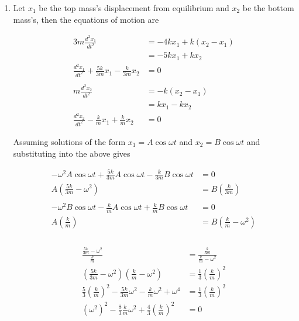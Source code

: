 \documentclass{article}
\begin{document}
\begin{enumerate}
  \item Let $x_1$ be the top mass's displacement from equilibrium and $x_2$ be the bottom mass's, then the equations of motion are

        \begin{align*}
          3 m \frac{d^2 x_1}{d t^2}                                       & = -4 k x_1 + k (x_2 - x_1) \\
                                                                          & = -5 k x_1 + k x_2         \\
          \frac{d^2 x_1}{d t^2} + \frac{5 k}{3 m} x_1 - \frac{k}{3 m} x_2 & = 0                        \\ \\
          m \frac{d^2 x_2}{d t^2}                                         & = -k (x_2 - x_1)           \\
                                                                          & = k x_1 - k x_2            \\
          \frac{d^2 x_2}{d t^2} - \frac{k}{m} x_1 + \frac{k}{m} x_2       & = 0
        \end{align*}

        Assuming solutions of the form $x_1 = A \cos \omega t$ and $x_2 = B \cos \omega t$ and substituting into the above gives

        \begin{align*}
          -\omega^2 A \cos \omega t + \frac{5 k}{3 m} A \cos \omega t - \frac{k}{3 m} B \cos \omega t & = 0                                       \\
          A \left( \frac{5 k}{3 m} - \omega^2 \right)                                                 & = B \left( \frac{k}{3 m} \right)          \\ \\
          -\omega^2 B \cos \omega t - \frac{k}{m} A \cos \omega t + \frac{k}{m} B \cos \omega t       & = 0                                       \\
          A \left( \frac{k}{m} \right)                                                                & = B \left( \frac{k}{m} - \omega^2 \right) \\ \\
        \end{align*}

        \begin{align*}
          \frac{\frac{5 k}{3 m} - \omega^2}{\frac{k}{m}}                                                        & = \frac{\frac{k}{3 m}}{\frac{k}{m} - \omega^2} \\
          \left( \frac{5 k}{3 m} - \omega^2 \right) \left( \frac{k}{m} - \omega^2 \right)                       & = \frac{1}{3} \left( \frac{k}{m} \right)^2     \\
          \frac{5}{3} \left( \frac{k}{m} \right)^2 - \frac{5 k}{3 m} \omega^2 - \frac{k}{m} \omega^2 + \omega^4 & = \frac{1}{3} \left( \frac{k}{m} \right)^2     \\
          (\omega^2)^2 - \frac{8}{3} \frac{k}{m} \omega^2 + \frac{4}{3} \left( \frac{k}{m} \right)^2            & = 0
        \end{align*}


\end{enumerate}
\end{document}
